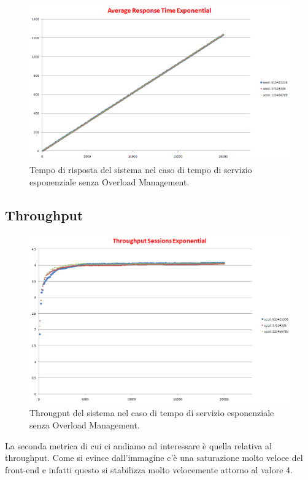 \begin{figure}[H]
	\begin{center}
	\includegraphics[scale=0.4]{img/exp_res_time.png}
	\caption[Tempo di risposta del sistema senza Overload Management (Legge Front-End:Esponenziale)]{Tempo di risposta del sistema nel caso di tempo di servizio esponenziale senza Overload Management.}
	\label{fig:exp_res_time}
	\end{center}
\end{figure}

\subsection{Throughput}
\begin{figure}[H]
	\begin{center}
	\includegraphics[scale=0.4]{img/exp_t_sess.png}
	\caption[Throughput del sistema senza Overload Management (Legge Front-End:Esponenziale)]{Througput del sistema nel caso di tempo di servizio esponenziale senza Overload Management.}
	\label{fig:exp_t_sess}
	\end{center}
\end{figure}
La seconda metrica di cui ci andiamo ad interessare è quella relativa al throughput. Come si evince dall'immagine c'è una saturazione molto veloce del front-end e infatti questo si stabilizza molto velocemente attorno al valore 4.

